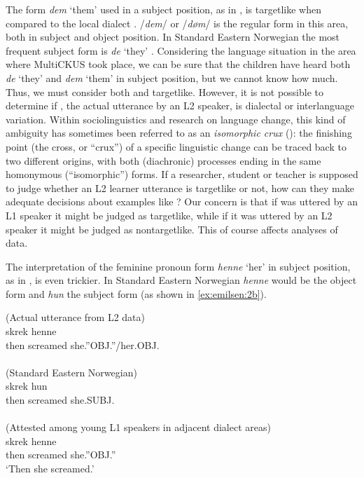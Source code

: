 \documentclass[output=paper,colorlinks,citecolor=brown,modfonts,nonflat]{../langscibook}
\begin{document}
The form \textit{dem} ‘them’ used in a subject position, as in , is targetlike when compared to the local dialect . /\textit{dem}/ or /\textit{døm}/ is the regular form in this area, both in subject and object position. In Standard Eastern Norwegian the most frequent subject form is \textit{de} ‘they’ . Considering the language situation in the area where MultiCKUS took place, we can be sure that the children have heard both \textit{de} ‘they’ and \textit{dem} ‘them’ in subject position, but we cannot know how much. Thus, we must consider both  and  targetlike. However, it is not possible to determine if , the actual utterance by an L2 speaker, is dialectal or interlanguage variation. Within sociolinguistics and research on language change, this kind of ambiguity has sometimes been referred to as an \textit{isomorphic crux} (\citealt{Hårstad2009}): the finishing point (the cross, or ``crux'') of a specific linguistic change can be traced back to two different origins, with both (diachronic) processes ending in the same homonymous (``isomorphic'') forms. If a researcher, student or teacher is supposed to judge whether an L2 learner utterance is targetlike or not, how can they make adequate decisions about examples like ? Our concern is that if  was uttered by an L1 speaker it might be judged as targetlike, while if it was uttered by an L2 speaker it might be judged as nontargetlike. This of course affects analyses of data.

The interpretation of the feminine pronoun form \textit{henne} ‘her’ in subject position, as in , is even trickier. In Standard Eastern Norwegian \textit{henne} would be the object form and \textit{hun} the subject form (as shown in \ref{ex:emilsen:2b}).


\ea\label{ex:emilsen:2}
\ea\label{ex:emilsen:2a}
(Actual utterance from L2 data)\\
  {skrek}  {henne}\\
 then screamed she.”OBJ.”/her.OBJ. \\
  \\
\ex\label{ex:emilsen:2b}
(Standard Eastern Norwegian)\\
  {skrek}  {hun}\\
 then screamed she.SUBJ. \\
  \\
\ex\label{ex:emilsen:2c}
(Attested among young L1 speakers  in adjacent dialect areas)\\
  {skrek}  {henne}\\
 then screamed she.”OBJ.”\\
 \glt ‘Then she screamed.’\\
\z
\z
\end{document}
